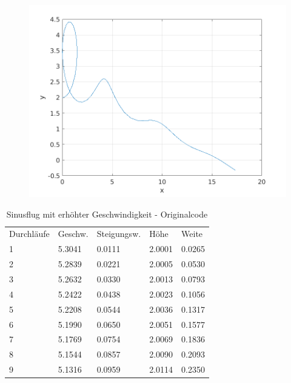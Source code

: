 \documentclass[a4paper,12pt]{scrartcl}
\begin{document}
\begin{figure}[htp]
	\centering
	\includegraphics{flightpath4.png}
	\label{fig:sin3}
\end{figure}
\begin{table}
\centering
\caption{Sinusflug mit erhöhter Geschwindigkeit - Originalcode}
\begin{tabular}{lllll}
Durchläufe & Geschw. & Steigungsw. & Höhe    & Weite    \\
1          & 5.3041 & 0.0111     & 2.0001 & 0.0265  \\
2          & 5.2839 & 0.0221     & 2.0005 & 0.0530  \\
3          & 5.2632 & 0.0330     & 2.0013 & 0.0793  \\
4          & 5.2422 & 0.0438     & 2.0023 & 0.1056  \\
5          & 5.2208 & 0.0544     & 2.0036 & 0.1317  \\
6          & 5.1990 & 0.0650     & 2.0051 & 0.1577  \\
7          & 5.1769 & 0.0754     & 2.0069 & 0.1836  \\
8          & 5.1544 & 0.0857     & 2.0090 & 0.2093  \\
9          & 5.1316 & 0.0959     & 2.0114 & 0.2350 
\end{tabular}
\end{table}
\end{document}
